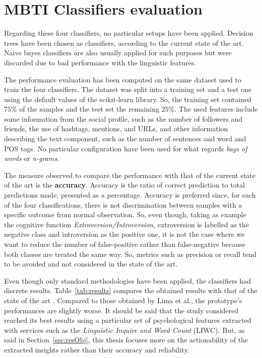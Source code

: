 \section{MBTI Classifiers evaluation}
Regarding these four classifiers, no particular setups have been applied.
Decision trees have been chosen as classifiers, according to the current state of the art.
Naive bayes classifiers are also usually applied for such purposes but were discarded due to bad performance with the linguistic features.

The performance evaluation has been computed on the same dataset used to train the four classifiers.
The dataset was split into a training set and a test one using the default values of the scikit-learn library. So, the training set contained $75\%$ of the samples and the test set the remaining $25\%$.
The used features include some information from the social profile, such as the number of followers and friends, the use of hashtags, mentions, and URLs, and other information describing the text component, such as the number of sentences and word and POS tags.
No particular configuration have been used for what regards \textit{bags of words} or \textit{n-grams}.

The measure observed to compare the performance with that of the current state of the art is the \textbf{accuracy}.
Accuracy is the ratio of correct prediction to total predictions made, presented as a percentage.
Accuracy is preferred since, for each of the four classifications, there is not discrimination between samples with a specific outcome from normal observation.
So, even though, taking as example the cognitive function \textit{Extroversion/Introversion}, extroversion is labelled as the negative class and introversion as the positive one, it is not the case where we want to reduce the number of false-positive rather than false-negative because both classes are treated the same way.
So, metrics such as precision or recall tend to be avoided and not considered in the state of the art.

Even though only standard methodologies have been applied, the classifiers had discrete results. 
Table~\ref{tab:results} compares the obtained results with that of the state of the art \cite{lima2019tecla}.
Compared to those obtained by Lima et al., the prototype's performances are slightly worse. 
It should be said that the study considered reached its best results using a particular set of psychological features extracted with services such as the \textit{Linguistic Inquire and Word Count} (LIWC).
But, as said in Section~\ref{sec:resObj}, this thesis focuses more on the actionability of the extracted insights rather than their accuracy and reliability.

